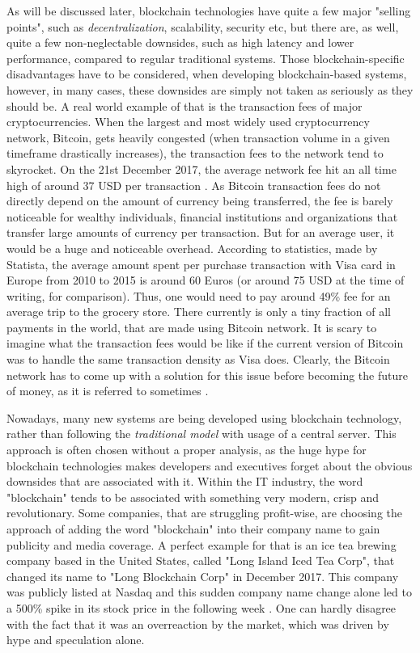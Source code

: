 As will be discussed later, blockchain technologies have quite a few major "selling points", such as \emph{\gls{decentralization}}, scalability, security etc, but there are, as well, quite a few non-neglectable downsides, such as high latency and lower performance, compared to regular traditional systems. Those blockchain-specific disadvantages have to be considered, when developing blockchain-based systems, however, in many cases, these downsides are simply not taken as seriously as they should be. A real world example of that is the transaction fees of major cryptocurrencies. When the largest and most widely used cryptocurrency network, Bitcoin, gets heavily congested (when transaction volume in a given timeframe drastically increases), the transaction fees to the network tend to skyrocket. On the 21st December 2017, the average network fee hit an all time high of around 37 USD per transaction \citep{btctxfee}. As Bitcoin transaction fees do not directly depend on the amount of currency being transferred, the fee is barely noticeable for wealthy individuals, financial institutions and organizations that transfer large amounts of currency per transaction. But for an average user, it would be a huge and noticeable overhead. According to statistics, made by Statista, the average amount spent per purchase transaction with Visa card in Europe from 2010 to 2015 is around 60 Euros \citep{averagevisatx} (or around 75 USD at the time of writing, for comparison). Thus, one would need to pay around 49\% fee for an average trip to the grocery store. There currently is only a tiny fraction of all payments in the world, that are made using Bitcoin network. It is scary to imagine what the transaction fees would be like if the current version of Bitcoin was to handle the same transaction density as Visa does. Clearly, the Bitcoin network has to come up with a solution for this issue before becoming the future of money, as it is referred to sometimes \citep{bitcointhefutureofmoney}. 

\pagebreak

Nowadays, many new systems are being developed using blockchain technology, rather than following the \emph{\gls{traditional model}} with usage of a central server. This approach is often chosen without a proper analysis, as the huge hype for blockchain technologies makes developers and executives forget about the obvious downsides that are associated with it. Within the IT industry, the word "blockchain" tends to be associated with something very modern, crisp and revolutionary. Some companies, that are struggling profit-wise, are choosing the approach of adding the word "blockchain" into their company name to gain publicity and media coverage. A perfect example for that is an ice tea brewing company based in the United States, called "Long Island Iced Tea Corp", that changed its name to "Long Blockchain Corp" in December 2017. This company was publicly listed at Nasdaq and this sudden company name change alone led to a 500\% spike in its stock price in the following week \citep{iceteablockchain}. One can hardly disagree with the fact that it was an overreaction by the market, which was driven by hype and speculation alone.





